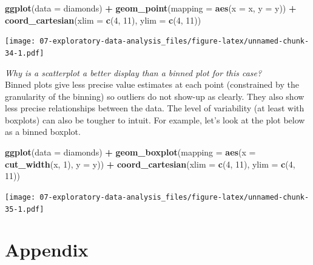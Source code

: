 \documentclass[]{book}
\newenvironment{Shaded}{\begin{snugshade}}{\end{snugshade}}
\newcommand{\DataTypeTok}[1]{\textcolor[rgb]{0.13,0.29,0.53}{#1}}
\newcommand{\DecValTok}[1]{\textcolor[rgb]{0.00,0.00,0.81}{#1}}
\newcommand{\KeywordTok}[1]{\textcolor[rgb]{0.13,0.29,0.53}{\textbf{#1}}}
\newcommand{\NormalTok}[1]{#1}
\newcommand{\OperatorTok}[1]{\textcolor[rgb]{0.81,0.36,0.00}{\textbf{#1}}}
\newcommand{\StringTok}[1]{\textcolor[rgb]{0.31,0.60,0.02}{#1}}
\theoremstyle{definition}
\theoremstyle{definition}
\theoremstyle{definition}
\theoremstyle{remark}
\begin{document}
\begin{Shaded}
\begin{Highlighting}[]
\KeywordTok{ggplot}\NormalTok{(}\DataTypeTok{data =}\NormalTok{ diamonds) }\OperatorTok{+}
\StringTok{  }\KeywordTok{geom_point}\NormalTok{(}\DataTypeTok{mapping =} \KeywordTok{aes}\NormalTok{(}\DataTypeTok{x =}\NormalTok{ x, }\DataTypeTok{y =}\NormalTok{ y)) }\OperatorTok{+}
\StringTok{  }\KeywordTok{coord_cartesian}\NormalTok{(}\DataTypeTok{xlim =} \KeywordTok{c}\NormalTok{(}\DecValTok{4}\NormalTok{, }\DecValTok{11}\NormalTok{), }\DataTypeTok{ylim =} \KeywordTok{c}\NormalTok{(}\DecValTok{4}\NormalTok{, }\DecValTok{11}\NormalTok{))}
\end{Highlighting}
\end{Shaded}

\texttt{[image: 07-exploratory-data-analysis\_files/figure-latex/unnamed-chunk-34-1.pdf]}

\emph{Why is a scatterplot a better display than a binned plot for this
case?}\\
Binned plots give less precise value estimates at each point
(constrained by the granularity of the binning) so outliers do not
show-up as clearly. They also show less precise relationships between
the data. The level of variability (at least with boxplots) can also be
tougher to intuit. For example, let's look at the plot below as a binned
boxplot.

\begin{Shaded}
\begin{Highlighting}[]
\KeywordTok{ggplot}\NormalTok{(}\DataTypeTok{data =}\NormalTok{ diamonds) }\OperatorTok{+}
\StringTok{  }\KeywordTok{geom_boxplot}\NormalTok{(}\DataTypeTok{mapping =} \KeywordTok{aes}\NormalTok{(}\DataTypeTok{x =} \KeywordTok{cut_width}\NormalTok{(x, }\DecValTok{1}\NormalTok{), }\DataTypeTok{y =}\NormalTok{ y)) }\OperatorTok{+}
\StringTok{  }\KeywordTok{coord_cartesian}\NormalTok{(}\DataTypeTok{xlim =} \KeywordTok{c}\NormalTok{(}\DecValTok{4}\NormalTok{, }\DecValTok{11}\NormalTok{), }\DataTypeTok{ylim =} \KeywordTok{c}\NormalTok{(}\DecValTok{4}\NormalTok{, }\DecValTok{11}\NormalTok{))}
\end{Highlighting}
\end{Shaded}

\texttt{[image: 07-exploratory-data-analysis\_files/figure-latex/unnamed-chunk-35-1.pdf]}

\hypertarget{appendix-2}{%
\chapter{Appendix}\label{appendix-2}}
\end{document}
